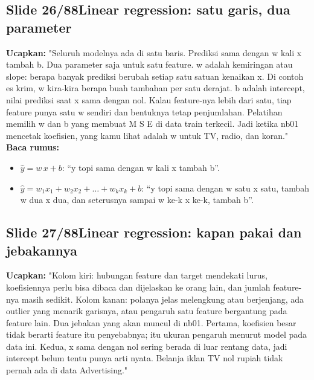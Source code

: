 \documentclass[11pt]{article}
\renewcommand{\framebox}[1]{\colorbox{acc!15}{\textcolor{acc}{\textbf{#1}}}}
\begin{document}
\subsection*{\framebox{Slide 26/88}\quad Linear regression: satu garis, dua parameter}
\textbf{Ucapkan:} "Seluruh modelnya ada di satu baris. Prediksi sama dengan w kali x tambah b. Dua parameter saja untuk satu feature. w adalah kemiringan atau slope: berapa banyak prediksi berubah setiap satu satuan kenaikan x. Di contoh es krim, w kira-kira berapa buah tambahan per satu derajat. b adalah intercept, nilai prediksi saat x sama dengan nol. Kalau feature-nya lebih dari satu, tiap feature punya satu w sendiri dan bentuknya tetap penjumlahan. Pelatihan memilih w dan b yang membuat M S E di data train terkecil. Jadi ketika nb01 mencetak koefisien, yang kamu lihat adalah w untuk TV, radio, dan koran."\\[2pt]
\textbf{Baca rumus:}\\[2pt]
\begin{itemize}\setlength\itemsep{0.2em}
\item $\hat{y} = w\,x + b$: ``y topi sama dengan w kali x tambah b''.
\item $\hat{y} = w_1 x_1 + w_2 x_2 + \dots + w_k x_k + b$: ``y topi sama dengan w satu x satu, tambah w dua x dua, dan seterusnya sampai w ke-k x ke-k, tambah b''.
\end{itemize}

\subsection*{\framebox{Slide 27/88}\quad Linear regression: kapan pakai dan jebakannya}
\textbf{Ucapkan:} "Kolom kiri: hubungan feature dan target mendekati lurus, koefisiennya perlu bisa dibaca dan dijelaskan ke orang lain, dan jumlah feature-nya masih sedikit. Kolom kanan: polanya jelas melengkung atau berjenjang, ada outlier yang menarik garisnya, atau pengaruh satu feature bergantung pada feature lain. Dua jebakan yang akan muncul di nb01. Pertama, koefisien besar tidak berarti feature itu penyebabnya; itu ukuran pengaruh menurut model pada data ini. Kedua, x sama dengan nol sering berada di luar rentang data, jadi intercept belum tentu punya arti nyata. Belanja iklan TV nol rupiah tidak pernah ada di data Advertising."\\[2pt]
\end{document}
